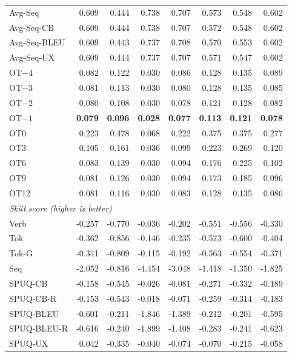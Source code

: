 {\begin{longtable}{@{}lrrrrrrr@{}}
\addlinespace
Avg-Seq & 0.609 & 0.444 & 0.738 & 0.707 & 0.573 & 0.548 & 0.602 \\
Avg-Seq-CB & 0.609 & 0.444 & 0.738 & 0.707 & 0.572 & 0.548 & 0.602 \\
Avg-Seq-BLEU & 0.609 & 0.443 & 0.737 & 0.708 & 0.570 & 0.553 & 0.602 \\
Avg-Seq-UX & 0.609 & 0.444 & 0.737 & 0.707 & 0.571 & 0.547 & 0.602 \\
\addlinespace
OT$-4$ & 0.082 & 0.122 & 0.030 & 0.086 & 0.128 & 0.135 & 0.089 \\
OT$-3$ & 0.081 & 0.113 & 0.030 & 0.080 & 0.128 & 0.135 & 0.085 \\
OT$-2$ & 0.080 & 0.108 & 0.030 & 0.078 & 0.121 & 0.128 & 0.082 \\
OT$-1$ & \textbf{0.079} & \textbf{0.096} & \textbf{0.028} & \textbf{0.077} & \textbf{0.113} & \textbf{0.121} & \textbf{0.078} \\
OT0 & 0.223 & 0.478 & 0.068 & 0.222 & 0.375 & 0.375 & 0.277 \\
OT3 & 0.105 & 0.161 & 0.036 & 0.099 & 0.223 & 0.269 & 0.120 \\
OT6 & 0.083 & 0.139 & 0.030 & 0.094 & 0.176 & 0.225 & 0.102 \\
OT9 & 0.081 & 0.126 & 0.030 & 0.094 & 0.173 & 0.185 & 0.096 \\
OT12 & 0.081 & 0.116 & 0.030 & 0.083 & 0.128 & 0.135 & 0.086 \\
\midrule
\multicolumn{8}{l}{\textit{Skill score (higher is better)}} \\
\midrule
Verb & -0.257 & -0.770 & -0.036 & -0.202 & -0.551 & -0.556 & -0.330 \\
\addlinespace
Tok & -0.362 & -0.856 & -0.146 & -0.235 & -0.573 & -0.600 & -0.404 \\
Tok-G & -0.341 & -0.809 & -0.115 & -0.192 & -0.563 & -0.554 & -0.371 \\
\addlinespace
Seq & -2.052 & -0.816 & -4.454 & -3.048 & -1.418 & -1.350 & -1.825 \\
\addlinespace
SPUQ-CB & -0.158 & -0.545 & -0.026 & -0.081 & -0.271 & -0.332 & -0.189 \\
SPUQ-CB-R & -0.153 & -0.543 & -0.018 & -0.071 & -0.259 & -0.314 & -0.183 \\
SPUQ-BLEU & -0.601 & -0.211 & -1.846 & -1.389 & -0.212 & -0.201 & -0.595 \\
SPUQ-BLEU-R & -0.616 & -0.240 & -1.899 & -1.408 & -0.283 & -0.241 & -0.623 \\
SPUQ-UX & \phantom{-}0.042 & -0.335 & -0.040 & -0.074 & -0.070 & -0.215 & -0.058 \\

\end{longtable}}
